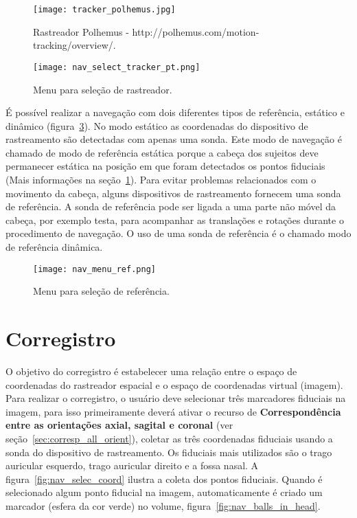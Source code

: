 \begin{figure}[!htb]
\centering
\texttt{[image: tracker\_polhemus.jpg]}
\caption{Rastreador Polhemus - http://polhemus.com/motion-tracking/overview/.}
\label{fig:tracker_polhemus}
\end{figure}

\begin{figure}[!htb]
\centering
\texttt{[image: nav\_select\_tracker\_pt.png]}
\caption{Menu para seleção de rastreador.}
\label{fig:nav_select_tracker}
\end{figure}

É possível realizar a navegação com dois diferentes tipos de referência, estático e dinâmico (figura~\ref{fig:nav_menu_ref}). No modo estático as coordenadas do dispositivo de rastreamento são detectadas com apenas uma sonda. Este modo de navegação é chamado de modo de referência estática porque a cabeça dos sujeitos deve permanecer estática na posição em que foram detectados os pontos fiduciais (Mais informações na seção~\ref{sec:corregistro}). 
Para evitar problemas relacionados com o movimento da cabeça, alguns dispositivos de rastreamento fornecem uma sonda de referência. A sonda de referência pode ser ligada a uma parte não móvel da cabeça, por exemplo testa, para acompanhar as translações e rotações durante o procedimento de navegação. O uso de uma sonda de referência é o chamado modo de referência dinâmica.

\begin{figure}[!htb]
\centering
\texttt{[image: nav\_menu\_ref.png]}
\caption{Menu para seleção de referência.}
\label{fig:nav_menu_ref}
\end{figure}

\section{Corregistro}
\label{sec:corregistro}

O objetivo do corregistro é estabelecer uma relação entre o espaço de coordenadas do rastreador espacial e o espaço de coordenadas virtual (imagem). Para realizar o corregistro, o usuário deve selecionar três marcadores fiduciais na imagem, para isso primeiramente deverá ativar o recurso de \textbf{Correspondência entre as orientações axial, sagital e coronal} (ver seção~\ref{sec:corresp_all_orient}), coletar as três coordenadas fiduciais usando a sonda do dispositivo de rastreamento. Os fiduciais mais utilizados são o trago auricular esquerdo, trago auricular direito e a fossa nasal. A figura~\ref{fig:nav_selec_coord} ilustra a coleta dos pontos fiduciais. Quando é selecionado algum ponto fiducial na imagem, automaticamente é criado um marcador (esfera da cor verde) no volume, figura~\ref{fig:nav_balls_in_head}.

